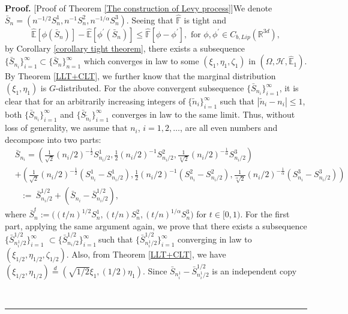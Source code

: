 \documentclass[a4paper,oneside,10pt]{article}%
\newenvironment{proof}[1][Proof]{\noindent \textbf{#1.} }{\  \rule{0.5em}{0.5em}}
\numberwithin{equation}{section}
\begin{document}
\begin{proof}
[Proof of Theorem \ref{The construction of Levy process}]We denote $\bar
{S}_{n}=(n^{-1/2}S_{n}^{1},n^{-1}S_{n}^{2},n^{-1/\alpha}S_{n}^{3})$. Seeing
that $\mathbb{\hat{F}}$ is tight and
\[
\mathbb{\hat{E}}[\phi(\bar{S}_{n})]-\mathbb{\hat{E}}[\phi^{\prime}(\bar{S}%
_{n})]\leq \mathbb{\hat{F}}[\phi-\phi^{\prime}],\text{ for }\phi,\phi^{\prime
}\in C_{b,Lip}(\mathbb{R}^{3d}),
\]
by Corollary \ref{corollary tight theorem}, there exists a subsequence $\{
\bar{S}_{n_{i}}\}_{i=1}^{\infty}\subset \{ \bar{S}_{n}\}_{n=1}^{\infty}$ which
converges in law to some $(\xi_{1},\eta_{1},\zeta_{1})$ in $(\Omega
,\mathcal{H},\mathbb{\hat{E}}_{1})$. By Theorem \ref{LLT+CLT}, we further know
that the marginal distribution $(\xi_{1},\eta_{1})$ is $G$-distributed. For
the above convergent subsequence $\{ \bar{S}_{n_{i}}\}_{i=1}^{\infty}$, it is
clear that for an arbitrarily increasing integers of $\{ \tilde{n}_{i}%
\}_{i=1}^{\infty}$ such that $|\tilde{n}_{i}-n_{i}|\leq1$, both $\{ \bar
{S}_{n_{i}}\}_{i=1}^{\infty}$ and $\{ \bar{S}_{\tilde{n}_{i}}\}_{i=1}^{\infty
}$ converges in law to the same limit. Thus, without loss of generality, we
assume that $n_{i}$, $i=1,2,\ldots$, are all even numbers and decompose into
two parts:
\begin{align*}
&  \bar{S}_{n_{i}}=\left(  \frac{1}{\sqrt{2}}(n_{i}/2)^{-\frac{1}{2}}%
S_{n_{i}/2}^{1},\frac{1}{2}(n_{i}/2)^{-1}S_{n_{i}/2}^{2},\frac{1}%
{\sqrt[\alpha]{2}}(n_{i}/2)^{-\frac{1}{\alpha}}S_{n_{i}/2}^{3}\right) \\
&  +\left(  \frac{1}{\sqrt{2}}(n_{i}/2)^{-\frac{1}{2}}(S_{n_{i}}^{1}%
-S_{n_{i}/2}^{1}),\frac{1}{2}(n_{i}/2)^{-1}(S_{n_{i}}^{2}-S_{n_{i}/2}%
^{2}),\frac{1}{\sqrt[\alpha]{2}}(n_{i}/2)^{-\frac{1}{\alpha}}(S_{n_{i}}%
^{3}-S_{n_{i}/2}^{3})\right) \\
&  \text{\  \  \ }:=\  \bar{S}_{n_{i}/2}^{1/2}+(\bar{S}_{n_{i}}-\bar{S}_{n_{i}%
/2}^{1/2}),
\end{align*}
where $\bar{S}_{n}^{t}:=\big((t/n)^{1/2}S_{n}^{1},(t/n)S_{n}^{2}%
,(t/n)^{1/\alpha}S_{n}^{3}\big)$ for $t\in \lbrack0,1)$. For the first part,
applying the same argument again, we prove that there exists a subsequence
$\big \{ \bar{S}_{n_{i}^{1}/2}^{1/2}\big \}_{i=1}^{\infty}$ $\subset
\big \{ \bar{S}_{n_{i}/2}^{1/2}\big \}_{i=1}^{\infty}\ $such that
$\big \{ \bar{S}_{n_{i}^{1}/2}^{1/2}\big \}_{i=1}^{\infty}$ converging in law
to $(\xi_{1/2},\eta_{1/2},\zeta_{1/2})$. Also, from Theorem \ref{LLT+CLT}, we
have $(\xi_{1/2},\eta_{1/2})\overset{d}{=}(\sqrt{1/2}\xi_{1},(1/2)\eta_{1})$.
Since $\bar{S}_{n_{i}^{1}}-\bar{S}_{n_{i}^{1}/2}^{1/2}$ is an independent copy

\end{proof}
\end{document}
